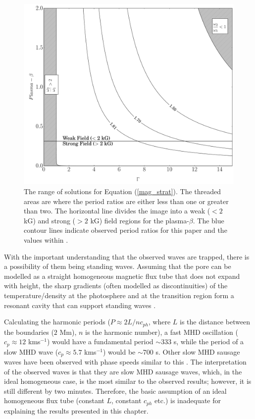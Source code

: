     \begin{figure}
        \centering
        \includegraphics[width=\textwidth]{harmonics.pdf}
        \caption{The range of solutions for Equation (\ref{mag_strat}).
            The threaded areas are where the period ratios are either less than one or greater than two.
            The horizontal line divides the image into a weak ($<2$ kG) and strong ($>2$ kG) field regions for the plasma-$\beta$.
            The blue contour lines indicate observed period ratios for this paper and the values within \cite{Dorotovic2014}.}
        \label{fig:harm}
    \end{figure}		
    
    With the important understanding that the observed waves are trapped, there is a possibility of them being standing waves.
    Assuming that the pore can be modelled as a straight homogeneous magnetic flux tube that does not expand with height, the sharp gradients (often modelled as discontinuities) of the temperature/density at the photosphere and at the transition region form a resonant cavity that can support standing waves \citep[see][]{fleck,malins}.  
    
    Calculating the harmonic periods ($P \approx 2L/nc_{ph}$, where $L$ is the distance between the boundaries ($2$ Mm), $n$ is the harmonic number), a fast MHD oscillation ($c_{p}\approx12$ kms$^{-1}$) would have a fundamental period $\sim$333 s, while the period of a slow MHD wave ($c_{p}\approx5.7$ kms$^{-1}$) would be $\sim$700 s.
   	Other slow MHD sausage waves have been observed with phase speeds similar to this \citep{2015A&A...579A..73M}.
    The interpretation of the observed waves is that they are slow MHD sausage waves, which, in the ideal homogeneous case, is the most similar to the observed results; however, it is still different by two minutes.
    Therefore, the basic assumption of an ideal homogeneous flux tube (constant $L$, constant $c_{ph}$ etc.) is inadequate for explaining the results presented in this chapter.
    
